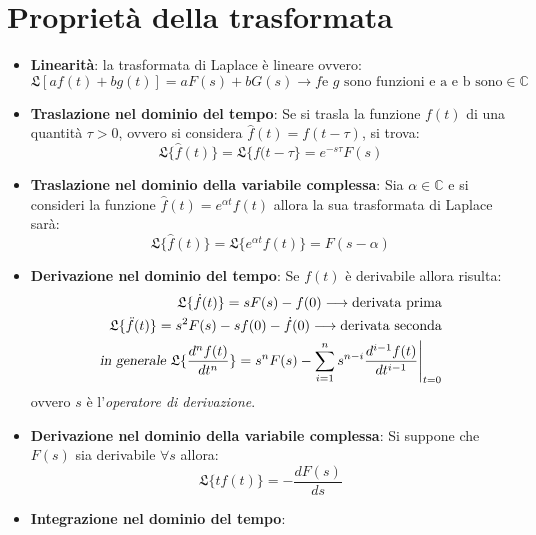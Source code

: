 \documentclass[a4paper]{report}
\begin{document}
\section {Propriet\`a della trasformata}
\begin{itemize}
\item{ \textbf{Linearit\`a}: la trasformata di Laplace \`e lineare ovvero: 
  \begin{equation}\label{eq:laplinear}
    \mathfrak{L}[af(t)+bg(t)]=aF(s)+bG(s) \longrightarrow \textrm{$f$
      e $g$ sono funzioni e a e b sono} \in \mathbb{C}
\end{equation}
}
\item{\textbf{Traslazione nel dominio del tempo}: Se si trasla la
  funzione $f(t)$ di una quantit\`a $\tau>0$, ovvero si considera 
  $\hat{f}(t)=f(t-\tau)$, si trova: 
\begin{equation}\label{eq:laptraslt}
  \mathfrak{L}\{\hat{f}(t)\} = \mathfrak{L}\{f(t-\tau\} = e^{-s\tau}F(s)
\end{equation}
}
\item{\textbf{Traslazione nel dominio della variabile complessa}: Sia
  $\alpha \in \mathbb{C}$ e si consideri la funzione
  $\hat{f}(t)=e^{\alpha t}f(t)$ allora la sua trasformata di Laplace sar\`a: 
  \begin{equation}\label{eq:laptrasls}
    \mathfrak{L}\{\hat{f}(t)\}=\mathfrak{L}\{e^{\alpha t}f(t)\}=F(s-\alpha)
  \end{equation}
}
\item{\textbf{Derivazione nel dominio del tempo}: Se $f(t)$ \`e
  derivabile allora risulta:
\begin{eqnarray}\label{eq:lapdert}
  \mathfrak{L}\{\dot f (t)\}=sF(s)-f(0) \longrightarrow \textrm{derivata prima} \\
  \mathfrak{L}\{\ddot f (t)\}=s^2F(s)-sf(0)-\dot f(0) \longrightarrow \textrm{derivata seconda} \\
  \textsl{in generale} ~\mathfrak{L}\{\frac{d^nf(t)}{dt^n}\}=s^nF(s) -
  \sum_{i=1}^n s^{n-i} \frac{d^{i-1}f(t)}{dt^{i-1}}\Bigg |_{t=0}
\end{eqnarray}
ovvero $s$ \`e l'\emph{operatore di derivazione}.
}
\item{\textbf{Derivazione nel dominio della variabile complessa}: Si
  suppone che $F(s)$ sia derivabile $\forall s$ allora: 
\begin{equation}\label{eq:lapders}
  \mathfrak{L}\{tf(t)\}=-\frac{dF(s)}{ds}
\end{equation}
}
\item{\textbf{Integrazione nel dominio del tempo}: 
}
\end{itemize}
\end{document}
